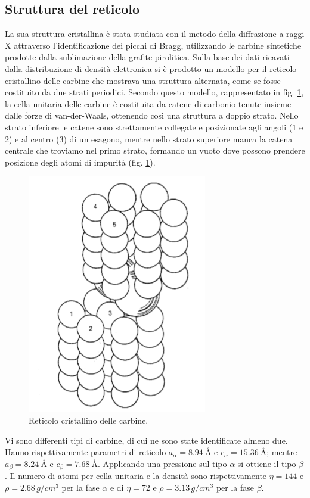\documentclass[a4paper,titlepage]{book}
\begin{document}
\subsection{Struttura del reticolo}
La sua struttura cristallina è stata studiata con il metodo della diffrazione a raggi X attraverso l'identificazione dei picchi di Bragg, utilizzando le carbine sintetiche prodotte dalla sublimazione della grafite pirolitica. 
Sulla base dei dati ricavati dalla distribuzione di densità elettronica si è prodotto un modello per il reticolo cristallino delle carbine che mostrava una struttura alternata, come se fosse costituito da due strati periodici. Secondo questo modello, rappresentato in fig. \ref{cri}, la cella unitaria delle carbine è costituita da catene di carbonio tenute insieme dalle forze di van-der-Waals, ottenendo così una struttura a doppio strato. Nello strato inferiore le catene sono strettamente collegate e posizionate agli angoli (1 e 2) e al centro (3) di un esagono, mentre nello strato superiore manca la catena centrale che troviamo nel primo strato, formando un vuoto dove possono prendere posizione degli atomi di impurità (fig. \ref{cri}).\\ 
\begin{figure}[h] 
	\centering \includegraphics[width=0.4\columnwidth]{carbynecrystal.png}
	\caption{
		Reticolo cristallino delle carbine.
	}
	\label{cri}
\end{figure}
Vi sono differenti tipi di carbine, di cui ne sono state identificate almeno due. Hanno rispettivamente parametri di reticolo $a_\alpha= \SI{ 8.94}{\angstrom}$ e $c_\alpha =  \SI{ 15.36}{\angstrom}$; mentre $a_\beta =  \SI{ 8.24}{\angstrom}$  e  $c_\beta= \SI{ 7.68}{\angstrom}$. Applicando una pressione sul tipo $\alpha$ si ottiene il tipo $\beta$. Il numero di atomi per cella unitaria e la densità sono rispettivamente $\eta=144$ e  $\rho=2.68\, g/cm^3$ per la fase $\alpha$ e  di $\eta=72$ e $\rho=3.13\, g/cm^3$ per la fase $\beta$.
\end{document}

